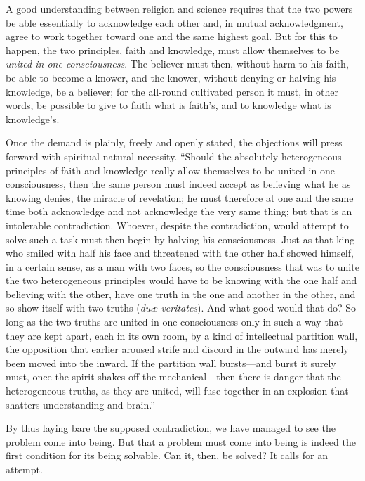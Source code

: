 \documentclass[12pt,a4paper]{article}
\newcommand{\opage}[1]{\marginnote{\footnotesize\textit{[#1]}}}
\begin{document}
A good understanding between religion and science requires that the
two powers be able essentially to acknowledge each other and, in
mutual acknowledgment, agree to work together toward one and the same
highest goal. But for this to happen, the two principles, faith and
knowledge, must allow themselves to be \emph{united in one
consciousness}. The believer must then, without harm to his faith, be
able to become a knower, and the knower, without denying or halving
his knowledge, be a believer; for the all-round cultivated person it
must, in other words, be possible to give to faith what is faith's,
and to knowledge what is knowledge's.

Once the demand is plainly, freely and openly stated, the objections
will press forward with spiritual natural necessity. ``Should the
absolutely heterogeneous principles of faith and knowledge really
allow themselves to be united in one consciousness, then the same
person must indeed accept as believing what he as knowing denies, the
miracle of revelation; he must therefore at one and the same time both
acknowledge and not acknowledge the very same thing; but that is an
intolerable
\opage{65}contradiction. Whoever, despite the contradiction, would
attempt to solve such a task must then begin by halving his
consciousness. Just as that king who smiled with half his face and
threatened with the other half showed himself, in a certain sense, as
a man with two faces, so the consciousness that was to unite the two
heterogeneous principles would have to be knowing with the one half
and believing with the other, have one truth in the one and another
in the other, and so show itself with two truths (\textit{duæ
veritates}). And what good would that do? So long as the two truths
are united in one consciousness only in such a way that they are kept
apart, each in its own room, by a kind of intellectual partition wall,
the opposition that earlier aroused strife and discord in the outward
has merely been moved into the inward. If the partition wall
bursts---and burst it surely must, once the spirit shakes off the
mechanical---then there is danger that the heterogeneous truths, as
they are united, will fuse together in an explosion that shatters
understanding and brain.''

By thus laying bare the supposed contradiction, we have managed to
see the problem come into being. But that a problem must come into
being is indeed the first condition for its being solvable. Can it,
then, be solved? It calls for an attempt.
\end{document}
